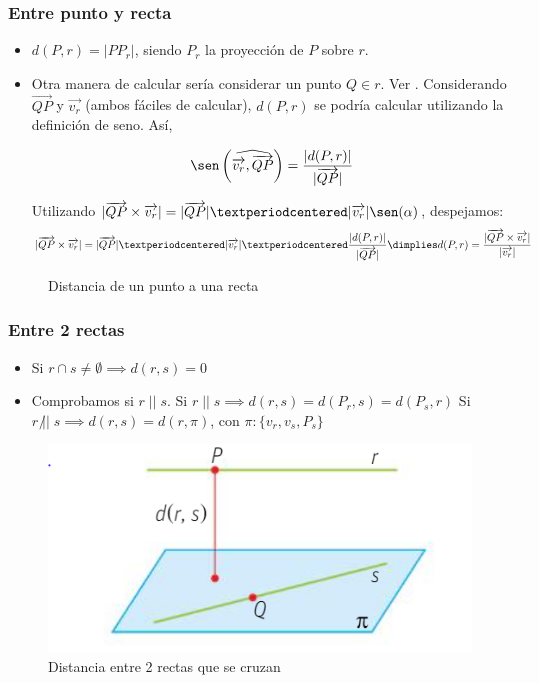 \subsubsection{Entre punto y recta}

\begin{itemize}
  \item $d(P,r) = |PP_{r}|$, siendo $P_r$ la proyección de $P$ sobre $r$.
  \item Otra manera de calcular sería considerar un punto $Q\in r$. Ver .
  \subitem Considerando $\vec{QP}$ y $\vec{v_r}$ (ambos fáciles de calcular), $d(P,r)$ se podría calcular utilizando la definición de seno. Así,
  
  \[\sen\left(\widehat{\vec{v_r},\vec{QP}}\right) = \displaystyle\frac{|d(P,r)|}{|\vec{QP}|}\]

  \subitem Utilizando $|\vec{QP}\times\vec{v_r}| = |\vec{QP}|·|\vec{v_r}|\sen(\alpha)$, despejamos:
  \[
    |\vec{QP}\times\vec{v_r}| = |\vec{QP}|·|\vec{v_r}|·\frac{|d(P,r)|}{|\vec{QP}|} \dimplies d(P,r) = \frac{|\vec{QP}\times\vec{v_r}|}{|\vec{v_r}|}
  \]
\end{itemize}

\begin{figure}[H]
\centering
{}

\caption{Distancia de un punto a una recta}
\label{fig::dist-punto-recta}
\end{figure}



\subsubsection{Entre 2 rectas}
\begin{itemize}
  \item Si $r\cap s \neq \emptyset \implies d(r,s) = 0$
  \item Comprobamos si $r\;||\;s$. 
  \subitem Si $r\;||\;s \implies d(r,s) = d(P_r,s) = d(P_s,r)$
  \subitem Si $r\;\not||\; s \implies d(r,s) = d(r,\pi)$, con $\pi:\{v_r,v_s,P_s\}$
\end{itemize}

\begin{figure}[H]
\centering
\includegraphics[scale=0.6]{img/dist-recta-recta-cruzan.png}
\caption{Distancia entre 2 rectas que se cruzan}
\label{fig::dist-rectas-cruzan}
\end{figure}


